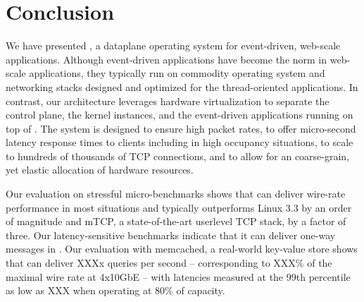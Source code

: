 
\section{Conclusion}

We have presented \ix, a dataplane operating system for event-driven,
web-scale applications.  Although event-driven applications have
become the norm in web-scale applications, they typically run on
commodity operating system and networking stacks designed and
optimized for the thread-oriented applications.  In contrast, our
architecture leverages hardware virtualization to separate the control
plane, the \ix kernel instances, and the event-driven applications
running on top of \ix.  The system is designed to ensure high packet
rates, to offer micro-second latency response times to clients
including in high occupancy situations, to scale to hundreds of
thousands of TCP connections, and to allow for an coarse-grain, yet
elastic allocation of hardware resources.

Our evaluation on stressful micro-benchmarks shows that \ix can
deliver wire-rate performance in most situations and typically
outperforms Linux 3.3 by an order of magnitude and mTCP, a
state-of-the-art userlevel TCP stack, by a factor of three.  Our
latency-sensitive benchmarks indicate that it can deliver one-way
messages in \microsecond.  Our evaluation with memcached, a
real-world key-value store shows that \ix can deliver XXXx queries per
second -- corresponding to XXX\% of the maximal wire rate at 4x10GbE -- with
latencies measured at the 99th percentile as low as XXX when operating
at 80\% of capacity. 


